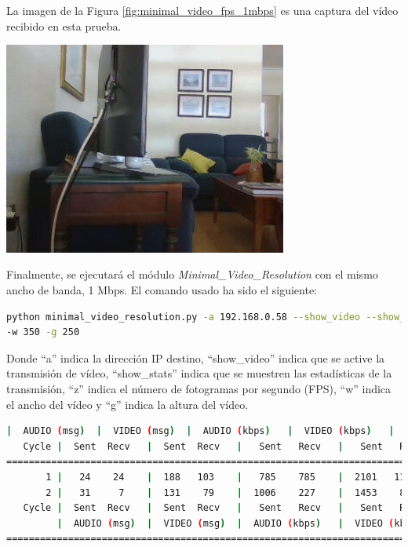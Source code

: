La imagen de la Figura \ref{fig:minimal_video_fps_1mbps} es una captura del vídeo recibido en esta prueba.
\begin{center}
  \includegraphics[width = 0.7\textwidth]{images/VideoRecibido1.2.png}
  \label{fig:minimal_video_fps_1mbps}
\end{center}

\newpage

Finalmente, se ejecutará el módulo \textit{Minimal\_Video\_Resolution} con el mismo ancho de banda, 1 Mbps. El comando usado ha sido el siguiente:
\begin{lstlisting}[language=bash,basicstyle=\ttfamily\scriptsize]
python minimal_video_resolution.py -a 192.168.0.58 --show_video --show_stats -z 12 \\
-w 350 -g 250
\end{lstlisting}
Donde ``a'' indica la dirección IP destino, ``show\_video'' indica que se active la transmisión de vídeo, ``show\_stats'' indica que se muestren las estadísticas de la transmisión, ``z'' indica el número de fotogramas por segundo (FPS), ``w'' indica el ancho del vídeo y ``g'' indica la altura del vídeo.
\vspace{\baselineskip}

\begin{lstlisting}[language=bash,basicstyle=\ttfamily\tiny]
         |  AUDIO (msg)  |  VIDEO (msg)  |  AUDIO (kbps)   |  VIDEO (kbps)   |     CPU (%) 
   Cycle |  Sent  Recv   |  Sent  Recv   |   Sent   Recv   |   Sent   Recv   | Program System
================================================================================================
       1 |   24    24    |  188   103    |   785    785    |  2101   1152    |  20      0       
       2 |   31     7    |  131    79    |  1006    227    |  1453    876    |  23     70       
   Cycle |  Sent  Recv   |  Sent  Recv   |   Sent   Recv   |   Sent   Recv   | Program System
         |  AUDIO (msg)  |  VIDEO (msg)  |  AUDIO (kbps)   |  VIDEO (kbps)   |     CPU (%) 
===========================================================================================
\end{lstlisting}

